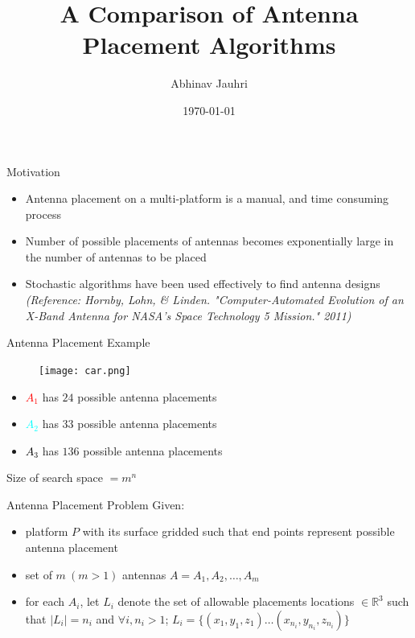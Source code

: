 \documentclass{beamer}
\title{\color{univred} A Comparison of Antenna Placement Algorithms}
\author{Abhinav Jauhri}
\date{\today}
\begin{document}
    \begin{frame}
        \color{univred}
        \titlepage
    \end{frame}

    \begin{frame}[t]{Motivation}
        \begin{itemize}
            \item<1->Antenna placement on a multi-platform is a manual, and time consuming process
            \item<2->Number of possible placements of antennas becomes exponentially large in the number of antennas to be placed
            \item<3-> Stochastic algorithms have been used effectively to find antenna designs {\textit{\small (Reference: Hornby, Lohn, \& Linden. "Computer-Automated Evolution of an X-Band Antenna for NASA's Space Technology 5 Mission." 2011)}}
        \end{itemize}
        \vspace{5mm}
        \centering{}
    \end{frame}

    \begin{frame}[t]{Antenna Placement Example}
        \begin{figure}
            \centering
            \texttt{[image: car.png]}
        \end{figure}
        \begin{itemize}
            \item \textcolor{red}{$A_1$} has $24$ possible antenna placements
            \item \textcolor{cyan}{$A_2$} has $33$ possible antenna placements
            \item \textcolor{black}{$A_3$} has $136$ possible antenna placements
        \end{itemize}
        Size of search space $= m^n$\\
    \end{frame}

    \begin{frame}[t]{Antenna Placement Problem}
        Given:
    \begin{itemize} \itemsep1.5em
            \item<1-> platform $P$ with its surface gridded such that end points represent possible antenna placement
            \item<2-> set of  $m~(m > 1)$ antennas $A = {A_1, A_2, \dots, A_m}$
            \item<3-> for each $A_i$, let $L_i$ denote the set of allowable placements locations $\in \mathbb R^3$ such that $\mid L_i \mid = n_i$ and $\forall i, n_i > 1$; $L_i = \{(x_{1}, y_{1}, z_{1}) \dots (x_{n_i}, y_{n_i}, z_{n_i})\}$
        \end{itemize}
        \vspace{10px}
        \centering{}
    \end{frame}
\end{document}
